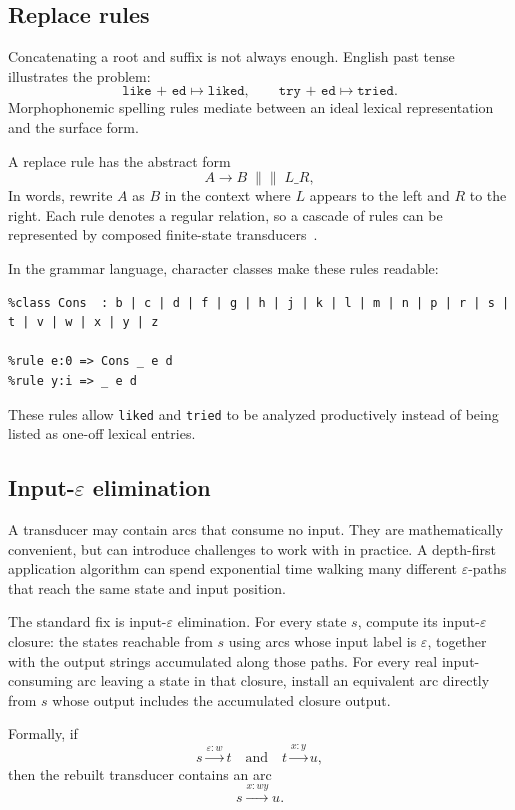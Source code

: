 \documentclass[11pt]{article}
\theoremstyle{definition}
\theoremstyle{plain}
\theoremstyle{remark}
\newcommand{\eps}{\varepsilon}
\begin{document}
\subsection{Replace rules}

Concatenating a root and suffix is not always enough. English past tense illustrates the
problem:
\[
  \texttt{like + ed} \mapsto \texttt{liked},
  \qquad
  \texttt{try + ed} \mapsto \texttt{tried}.
\]
Morphophonemic spelling rules mediate between an ideal lexical representation and the surface
form.

A replace rule has the abstract form
\[
  A \to B \;\|\|\; L \_ R,
\]
In words, rewrite $A$ as $B$ in the context where $L$ appears to the left and $R$ to the right.
Each rule denotes a regular relation, so a cascade of rules can be represented by composed
finite-state transducers~\cite{kaplan1994regular}.

In the grammar language, character classes make these rules readable:

\begin{lstlisting}[language=gram]
%class Vowel : a | e | i | o | u
%class Cons  : b | c | d | f | g | h | j | k | l | m | n | p | r | s | t | v | w | x | y | z

%rule e:0 => Cons _ e d
%rule y:i => _ e d
\end{lstlisting}

These rules allow \texttt{liked} and \texttt{tried} to be analyzed productively instead of being
listed as one-off lexical entries.

\subsection{Input-$\eps$ elimination}

A transducer may contain arcs that consume no input. They are mathematically convenient, but
can introduce challenges to work with in practice. A depth-first application algorithm can spend exponential time walking
many different $\eps$-paths that reach the same state and input position.

The standard fix is input-$\eps$ elimination. For every state $s$, compute its input-$\eps$
closure: the states reachable from $s$ using arcs whose input label is $\eps$, together with the
output strings accumulated along those paths. For every real input-consuming arc leaving a state
in that closure, install an equivalent arc directly from $s$ whose output includes the accumulated
closure output.

Formally, if
\[
  s \xrightarrow{\eps:w} t
  \quad\text{and}\quad
  t \xrightarrow{x:y} u,
\]
then the rebuilt transducer contains an arc
\[
  s \xrightarrow{x:wy} u.
\]
\end{document}
